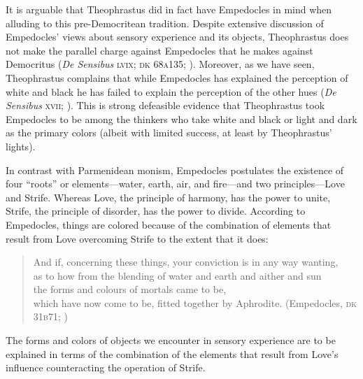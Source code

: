 It is arguable that Theophrastus did in fact have Empedocles in mind when alluding to this pre-Democritean tradition. Despite extensive discussion of Empedocles' views about sensory experience and its objects, Theophrastus does not make the parallel charge against Empedocles that he makes against Democritus (\emph{De Sensibus} \textsc{lvix}; \textsc{dk} 68\textsc{a}135; \citealt{Stratton:1917vn}). Moreover, as we have seen, Theophrastus complains that while Empedocles has explained the perception of white and black he has failed to explain the perception of the other hues (\emph{De Sensibus} \textsc{xvii}; \citealt{Stratton:1917vn}). This is strong defeasible evidence that Theophrastus took Empedocles to be among the thinkers who take white and black or light and dark as the primary colors (albeit with limited success, at least by Theophrastus' lights).

In contrast with Parmenidean monism, Empedocles postulates the existence of four ``roots'' or elements---water, earth, air, and fire---and two principles---\-Love and Strife. Whereas Love, the principle of harmony, has the power to unite, Strife, the principle of disorder, has the power to divide. According to Empedocles, things are colored because of the combination of elements that result from Love overcoming Strife to the extent that it does:
\begin{verse}
    And if, concerning these things, your conviction is in any way wanting,\\
    as to how from the blending of water and earth and aither and sun\\
    the forms and colours of mortals came to be,\\
    which have now come to be, fitted together by Aphrodite.
    (Empedocles, \textsc{dk} 31\textsc{b}71; \citealt[74 249]{Inwood:2001ve})
\end{verse}
The forms and colors of objects we encounter in sensory experience are to be explained in terms of the combination of the elements that result from Love's influence counteracting the operation of Strife.

